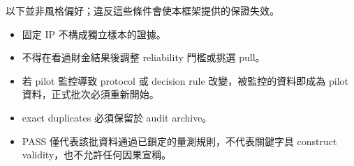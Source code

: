 \documentclass[12pt,a4paper,oneside]{article}
\begin{document}
以下並非風格偏好；違反這些條件會使本框架提供的保證失效。

\begin{itemize}
\item 固定 IP 不構成獨立樣本的證據。
\item 不得在看過財金結果後調整 reliability 門檻或挑選 pull。
\item 若 pilot 監控導致 protocol 或 decision rule 改變，被監控的資料即成為 pilot 資料，正式批次必須重新開始。
\item exact duplicates 必須保留於 audit archive。
\item PASS 僅代表該批資料通過已鎖定的量測規則，不代表關鍵字具 construct validity，也不允許任何因果宣稱。
\end{itemize}
\end{document}
